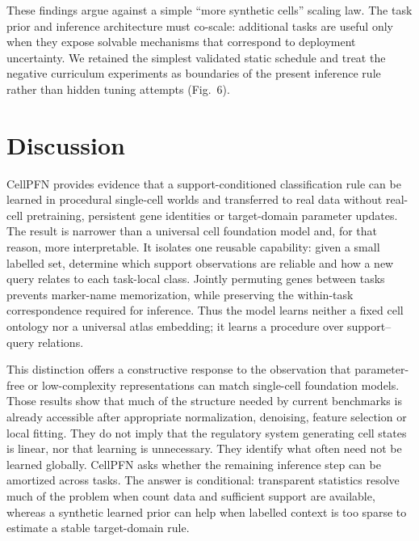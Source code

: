 \documentclass[12pt]{article}
\begin{document}
These findings argue against a simple “more synthetic cells” scaling law. The task prior and inference architecture must co-scale: additional tasks are useful only when they expose solvable mechanisms that correspond to deployment uncertainty. We retained the simplest validated static schedule and treat the negative curriculum experiments as boundaries of the present inference rule rather than hidden tuning attempts (Fig.~6).


\section*{Discussion}

CellPFN provides evidence that a support-conditioned classification rule can be learned in procedural single-cell worlds and transferred to real data without real-cell pretraining, persistent gene identities or target-domain parameter updates. The result is narrower than a universal cell foundation model and, for that reason, more interpretable. It isolates one reusable capability: given a small labelled set, determine which support observations are reliable and how a new query relates to each task-local class. Jointly permuting genes between tasks prevents marker-name memorization, while preserving the within-task correspondence required for inference. Thus the model learns neither a fixed cell ontology nor a universal atlas embedding; it learns a procedure over support--query relations.

This distinction offers a constructive response to the observation that parameter-free or low-complexity representations can match single-cell foundation models\cite{souza2026parameterfree}. Those results show that much of the structure needed by current benchmarks is already accessible after appropriate normalization, denoising, feature selection or local fitting. They do not imply that the regulatory system generating cell states is linear, nor that learning is unnecessary. They identify what often need not be learned globally. CellPFN asks whether the remaining inference step can be amortized across tasks. The answer is conditional: transparent statistics resolve much of the problem when count data and sufficient support are available, whereas a synthetic learned prior can help when labelled context is too sparse to estimate a stable target-domain rule.
\end{document}
